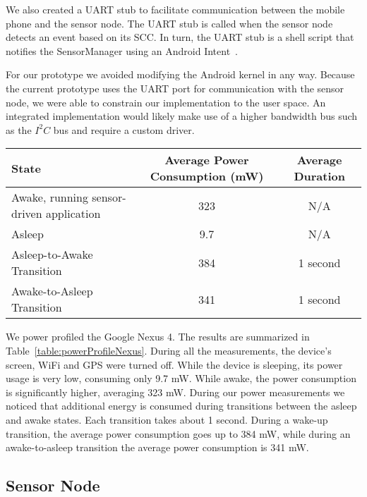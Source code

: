We also created a UART stub to facilitate communication between the
mobile phone and the sensor node. The UART stub is called when
the sensor node detects an event based on its SCC.
In turn, the UART stub is a shell script that notifies the
SensorManager using an Android Intent~\cite{androidintents}.

For our prototype we avoided modifying the Android kernel in any way.
Because the current prototype uses the UART port for communication
with the sensor node, we were able to constrain our implementation to
the user space.  An integrated implementation would likely make use of
a higher bandwidth bus such as the $I^2C$ bus and require a custom
driver.

\bgroup
\def\arraystretch{1.5}
\begin{table*}[t]
\centering
{\small
	\begin{tabular}{| l | c | c |}
		\hline
		\textbf{State}								& \textbf{Average Power Consumption (mW)} 		& \textbf{Average Duration} \\ \hline
		Awake, running sensor-driven application 	& 323 											& N/A \\ \hline
		Asleep 										& 9.7 											& N/A \\ \hline
		Asleep-to-Awake Transition 					& 384 											& 1 second \\ \hline
		Awake-to-Asleep Transition 					& 341 											& 1 second \\ \hline
	\end{tabular}
}
	\caption{Google Nexus 4 power profile.}
	\label{table:powerProfileNexus}
\end{table*}
\egroup

We power profiled the Google Nexus 4.  The results are summarized in
Table~\ref{table:powerProfileNexus}.  During all the measurements, the
device's screen, WiFi and GPS were turned off.  While the device is
sleeping, its power usage is very low, consuming only 9.7 mW.  While
awake, the power consumption is significantly higher, averaging 323
mW.  During our power measurements we noticed that additional energy is
consumed during transitions between the asleep and awake states.  Each
transition takes about 1 second.  During a wake-up transition, the
average power consumption goes up to 384 mW, while during an
awake-to-asleep transition the average power consumption is 341 mW.


\subsection{Sensor Node}
\label{subsec:sensorNode}

